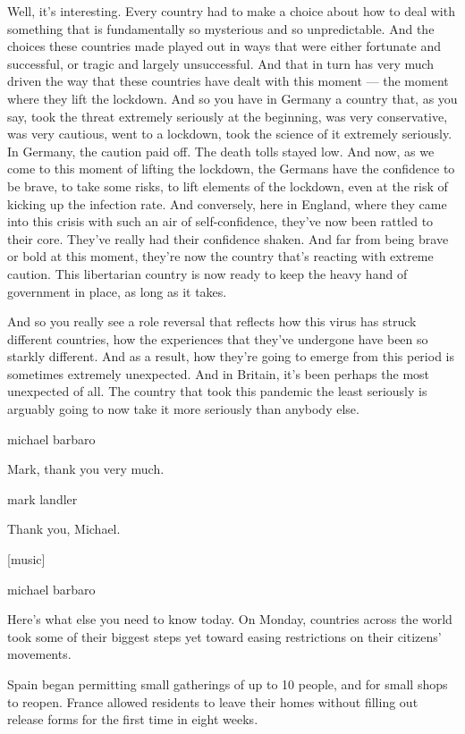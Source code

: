 Well, it's interesting. Every country had to make a choice about how to
deal with something that is fundamentally so mysterious and so
unpredictable. And the choices these countries made played out in ways
that were either fortunate and successful, or tragic and largely
unsuccessful. And that in turn has very much driven the way that these
countries have dealt with this moment --- the moment where they lift the
lockdown. And so you have in Germany a country that, as you say, took
the threat extremely seriously at the beginning, was very conservative,
was very cautious, went to a lockdown, took the science of it extremely
seriously. In Germany, the caution paid off. The death tolls stayed low.
And now, as we come to this moment of lifting the lockdown, the Germans
have the confidence to be brave, to take some risks, to lift elements of
the lockdown, even at the risk of kicking up the infection rate. And
conversely, here in England, where they came into this crisis with such
an air of self-confidence, they've now been rattled to their core.
They've really had their confidence shaken. And far from being brave or
bold at this moment, they're now the country that's reacting with
extreme caution. This libertarian country is now ready to keep the heavy
hand of government in place, as long as it takes.

And so you really see a role reversal that reflects how this virus has
struck different countries, how the experiences that they've undergone
have been so starkly different. And as a result, how they're going to
emerge from this period is sometimes extremely unexpected. And in
Britain, it's been perhaps the most unexpected of all. The country that
took this pandemic the least seriously is arguably going to now take it
more seriously than anybody else.

michael barbaro

Mark, thank you very much.

mark landler

Thank you, Michael.

{[}music{]}

michael barbaro

Here's what else you need to know today. On Monday, countries across the
world took some of their biggest steps yet toward easing restrictions on
their citizens' movements.

Spain began permitting small gatherings of up to 10 people, and for
small shops to reopen. France allowed residents to leave their homes
without filling out release forms for the first time in eight weeks.

